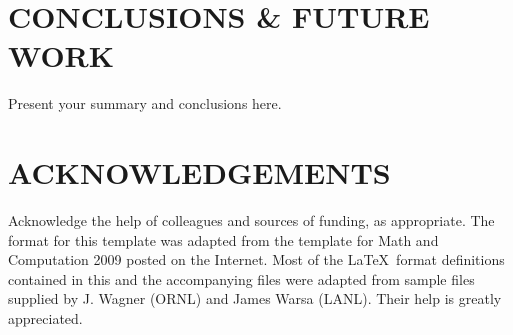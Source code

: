 \documentclass{physor2012}
\begin{document}
%
\section{CONCLUSIONS \& FUTURE WORK}
\label{sec:conclusions}
%
Present your summary and conclusions here.
%
\section*{ACKNOWLEDGEMENTS}
%
Acknowledge the help of colleagues and sources of funding, as appropriate.
%
The format for this template was adapted from the template for Math and Computation 2009 
posted on the Internet.  Most of the \LaTeX\ format definitions contained
in this and the accompanying files were adapted from sample files supplied 
by J. Wagner (ORNL) and James Warsa (LANL). Their help is greatly appreciated.

%
\setlength{\baselineskip}{12pt}


\end{document}
